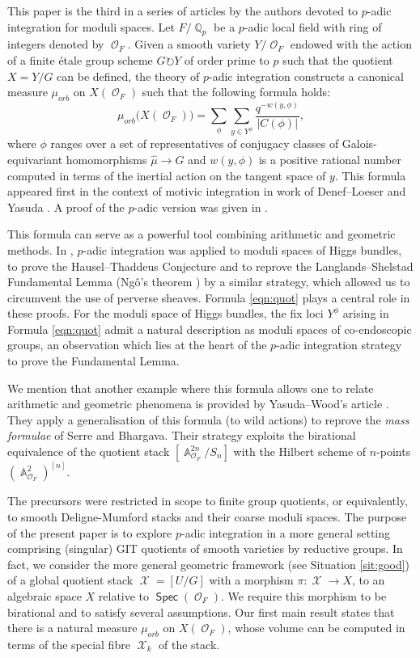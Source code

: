 \documentclass{article}
\DeclareMathOperator{\Xc}{\mathcal{X}}
\DeclareMathOperator{\Oc}{\mathcal{O}}
\DeclareMathOperator{\Ab}{\mathbb{A}}
\DeclareMathOperator{\Spec}{\mathsf{Spec}}
\DeclareMathOperator{\Qb}{\mathbb{Q}}
\theoremstyle{definition}
\theoremstyle{plain}
\begin{document}
This paper is the third in a series of articles by the authors devoted to $p$-adic integration for moduli spaces. Let $F/\Qb_p$ be a $p$-adic local field with ring of integers denoted by $\Oc_F$. Given a smooth variety $Y/\Oc_F$ endowed with the action of a finite \'etale group scheme $G \circlearrowright Y$ of order prime to $p$ such that the quotient $X=Y/G$ can be defined, the theory of $p$-adic integration constructs a canonical measure $\mu_{orb}$ on $X(\Oc_F)$ such that the following formula holds:
\begin{equation}\label{eqn:quot}
\mu_{orb}\big(X(\Oc_F)\big) = \sum_{\phi} \sum_{y\in Y^{\phi}} \frac{q^{-w(y,\phi)}}{|C(\phi)|},
\end{equation}
where $\phi$ ranges over a set of representatives of conjugacy classes of Galois-equivariant homomorphisms $\widehat{\mu} \to G$ and $w(y,\phi)$ is a positive rational number computed in terms of the inertial action on the tangent space of $y$. This formula appeared first in the context of motivic integration in work of Denef--Loeser \cite{DL2002} and Yasuda \cite{Ya06}. A proof of the $p$-adic version was given in \cite{GWZ20a}.

This formula can serve as a powerful tool combining arithmetic and geometric methods. In \cite{GWZ20b,GWZ20a}, $p$-adic integration was applied to moduli spaces of Higgs bundles, to prove the Hausel--Thaddeus Conjecture \cite{HT03} and to reprove the Langlands--Shelstad Fundamental Lemma (Ng\^o's theorem \cite{MR2856372}) by a similar strategy, which allowed us to circumvent the use of perverse sheaves. Formula \eqref{eqn:quot} plays a central role in these proofs. For the moduli space of Higgs bundles, the fix loci $Y^{\phi}$ arising in Formula \ref{eqn:quot} admit a natural description as moduli spaces of co-endoscopic groups, an observation which lies at the heart of the $p$-adic integration strategy to prove the Fundamental Lemma.


We mention that another example where this formula allows one to relate arithmetic and geometric phenomena is provided by Yasuda--Wood's article \cite{wood2015mass}. They apply a generalisation of this formula (to wild actions) to reprove the \emph{mass formulae} of Serre and Bhargava. Their strategy exploits the birational equivalence of the quotient stack $[\Ab^{2n}_{\Oc_F}/S_n]$ with the Hilbert scheme of $n$-points $(\Ab^2_{\Oc_F})^{[n]}$.


The precursors \cite{GWZ20b,GWZ20a} were restricted in scope to finite group quotients, or equivalently, to smooth Deligne-Mumford stacks and their coarse moduli spaces. The purpose of the present paper is to explore $p$-adic integration in a more general setting comprising (singular) GIT quotients of smooth varieties by reductive groups. In fact, we consider the more general geometric framework (see Situation \ref{sit:good}) of a global quotient stack $\Xc = [U/G]$ with a morphism 
$\pi: \Xc \to X$,
to an algebraic space $X$ relative to $\Spec(\Oc_F)$. We require this morphism to be birational and to satisfy several assumptions. Our first main result states that there is a natural measure $\mu_{orb}$ on $X(\Oc_F)$, whose volume can be computed in terms of the special fibre $\Xc_k$ of the stack. 
\end{document}
